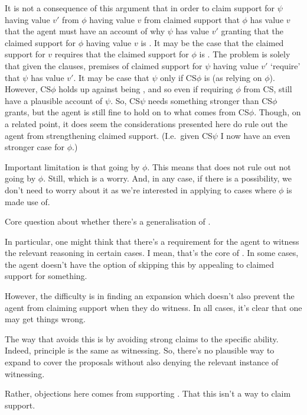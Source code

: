 \begin{note}
  It is not a consequence of this argument that in order to claim support for \(\psi\) having value \(v'\) from \(\phi\) having value \(v\) from claimed support that \(\phi\) has value \(v\) that the agent must have an account of why \(\psi\) has value \(v'\) granting that the claimed support for \(\phi\) having value \(v\) is \mom{}.
  It may be the case that the claimed support for \(v\) requires that the claimed support for \(\phi\) is \nmom{}.
  The problem is solely that given the clauses, premises of claimed support for \(\psi\) having value \(v'\) `require' that \(\psi\) has value \(v'\).
  It may be case that \(\psi\) only if CS\(\phi\) is \nmom{} (as relying on \(\phi\)).
  However, CS\(\phi\) holds up against being \mom{}, and so even if requiring \(\phi\) from CS, still have a plausible account of \(\psi\).
  So, CS\(\psi\) needs something stronger than CS\(\phi\) grants, but the agent is still fine to hold on to what comes from CS\(\phi\).
  Though, on a related point, it does seem the considerations presented here do rule out the agent from strengthening claimed support.
  (I.e.\ given CS\(\psi\) I now have an even stronger case for \(\phi\).)
\end{note}

\begin{note}
  Important limitation is that going by \(\phi\).
  This means that \nI{} does not rule out not going by \(\phi\).
  Still, \requ{} which is a worry.
  And, in any case, if there is a possibility, we don't need to worry about it as we're interested in applying \nI{} to cases where \(\phi\) is made use of.
\end{note}

\begin{note}[Generalising \nI{}]
  Core question about whether there's a generalisation of \nI{}.

  In particular, one might think that there's a requirement for the agent to witness the relevant reasoning in certain cases.
  I mean, that's the core of \nI{}.
  In some cases, the agent doesn't have the option of skipping this by appealing to claimed support for something.

  However, the difficulty is in finding an expansion which doesn't also prevent the agent from claiming support when they do witness.
  In all cases, it's clear that one may get things wrong.

  The way that \adB{} avoids this is by avoiding strong claims to the specific ability.
  Indeed, principle is the same as witnessing.
  So, there's no plausible way to expand \nI{} to cover the proposals without also denying the relevant instance of witnessing.

  Rather, objections here comes from supporting \ESU{}.
  That this isn't a way to claim support.
\end{note}

